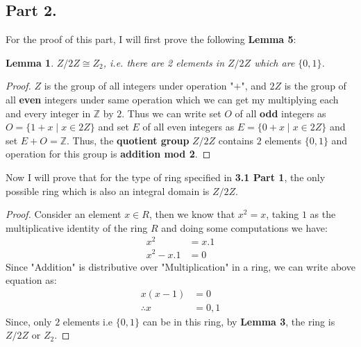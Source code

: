 \documentclass{article}
\newtheorem{lemma}{Lemma}
\begin{document}
{  \subsection{Part 2.}{
    For the proof of this part, I will first prove the following \textbf{Lemma 5}:
    \begin{lemma}
      $Z/2Z \cong Z_2$, i.e. there are 2 elements in $Z/2Z$ which are $\{0,1\}$.
    \end{lemma}
    \begin{proof}
      $Z$ is the group of all integers under operation "$+$", and $2Z$ is the group of all \textbf{even} integers under same operation which we can get my multiplying each and every integer in $\mathbb{Z}$ by $2$. \newline
      Thus we can write set $O$ of all \textbf{odd} integers as $O=\{1+x \mid x \in 2Z\}$ and set $E$ of all even integers as $E=\{0+x \mid x \in 2Z\}$ and set $E+O=\mathbb{Z}$. \newline
      Thus, the \textbf{quotient group} $Z/2Z$ contains $2$ elements $\{0,1\}$ and operation for this group is \textbf{addition mod 2}.
    \end{proof}
    Now I will prove that for the type of ring specified in \textbf{3.1 Part 1}, the only possible ring which is also an integral domain is $Z/2Z$.
    \begin{proof}
      Consider an element $x \in R$, then we know that $x^2=x$, taking $1$ as the multiplicative identity of the ring $R$ and doing some computations we have:
      \begin{align*}
        x^2&=x.1 \\
        x^2-x.1&=0
      \end{align*}
      Since "Addition" is distributive over "Multiplication" in a ring, we can write above equation as:
      \begin{align}
        x(x-1)&=0 \label{eq:4} \\
        \therefore x&=0,1
      \end{align}
      Since, only $2$ elements i.e $\{0,1\}$ can be in this ring, by \textbf{Lemma 3}, the ring is $Z/2Z$ or $Z_2$.
    \end{proof}
  }
}
\end{document}
